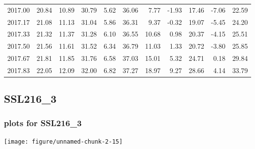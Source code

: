 \documentclass[10pt,a4paper]{article}\usepackage[]{graphicx}\usepackage[]{color}
\makeatletter
\def\maxwidth{ %
  \ifdim\Gin@nat@width>\linewidth
    \linewidth
  \else
    \Gin@nat@width
  \fi
}
\newcommand{\AaA}{\_}
\makeatother
\begin{document}
\begin{table}[ht]
\begin{tabular}{rrrrrrrrrrr}
  2017.00 & 20.84 & 10.89 & 30.79 & 5.62 & 36.06 & 7.77 & -1.93 & 17.46 & -7.06 & 22.59 \\ 
  2017.17 & 21.08 & 11.13 & 31.04 & 5.86 & 36.31 & 9.37 & -0.32 & 19.07 & -5.45 & 24.20 \\ 
  2017.33 & 21.32 & 11.37 & 31.28 & 6.10 & 36.55 & 10.68 & 0.98 & 20.37 & -4.15 & 25.51 \\ 
  2017.50 & 21.56 & 11.61 & 31.52 & 6.34 & 36.79 & 11.03 & 1.33 & 20.72 & -3.80 & 25.85 \\ 
  2017.67 & 21.81 & 11.85 & 31.76 & 6.58 & 37.03 & 15.01 & 5.32 & 24.71 & 0.18 & 29.84 \\ 
  2017.83 & 22.05 & 12.09 & 32.00 & 6.82 & 37.27 & 18.97 & 9.27 & 28.66 & 4.14 & 33.79 \\ 
   \hline
\end{tabular}
\end{table}

\newpage
\subsection{SSL216\AaA 3}
\subsubsection{plots for SSL216\AaA 3}

\texttt{[image: figure/unnamed-chunk-2-15]} 

\newpage
\end{document}
